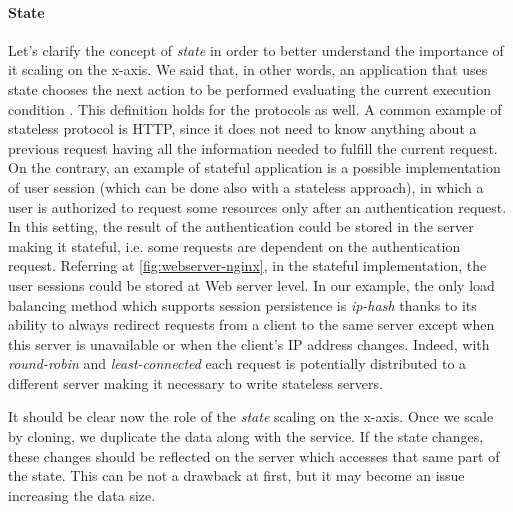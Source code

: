 \paragraph{State}
Let's clarify the concept of \emph{state} in order to better understand the
importance of it scaling on the x-axis. We said that, in other words, an
application that uses state chooses the next action to be performed evaluating
the current execution condition \cite{bib:art-of-scalability}. This definition
holds for the protocols as well. A common example of stateless protocol is HTTP,
since it does not need to know anything about a previous request having all the
information needed to fulfill the current request. On the contrary, an example
of stateful application is a possible implementation of user session (which can
be done also with a stateless approach), in which a user is authorized to
request some resources only after an authentication request. In this setting,
the result of the authentication could be stored in the server making it
stateful, i.e. some requests are dependent on the authentication request.
Referring at \autoref{fig:webserver-nginx}, in the stateful implementation, the
user sessions could be stored at Web server level. In our example, the only load
balancing method which supports session persistence is \emph{ip-hash} thanks to
its ability to always redirect requests from a client to the same server except
when this server is unavailable or when the client's IP address changes. Indeed,
with \emph{round-robin} and \emph{least-connected} each request is potentially
distributed to a different server making it necessary to write stateless
servers.

It should be clear now the role of the \emph{state} scaling on the x-axis. Once
we scale by cloning, we duplicate the data along with the service. If the state
changes, these changes should be reflected on the server which accesses that
same part of the state. This can be not a drawback at first, but it may become
an issue increasing the data size.


